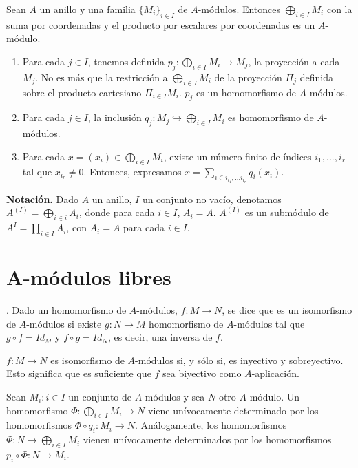 \documentclass[../main.tex]{subfiles}
\begin{document}
\begin{proposition}
  Sean $A$ un anillo y una familia $\{M_i\}_{i\in I}$ de $A$-módulos. Entonces $\bigoplus_{i\in I}M_i$ con la suma por coordenadas y el producto por escalares por coordenadas es un $A$-módulo.
\end{proposition}

\begin{remark}
  \begin{enumerate}
    \item Para cada $j\in I$, tenemos definida $p_j:\bigoplus_{i\in I}M_i\rightarrow M_j$, la proyección a cada $M_j$. No es más que la restricción a $\bigoplus_{i\in I}M_i$ de la proyección $\Pi_j$ definida sobre el producto cartesiano $\Pi_{i\in I}M_i$. $p_j$ es un homomorfismo de $A$-módulos.
    \item Para cada $j\in I$, la inclusión $q_j:M_j \hookrightarrow \bigoplus_{i\in I}M_i$ es homomorfismo de $A$-módulos.
    \item  Para cada $x=(x_i)\in \bigoplus_{i\in I}M_i$, existe un número finito de índices $i_1,...,i_r$ tal que $x_{i_r}\neq 0$. Entonces, expresamos $x=\sum_{i\in {i_{i_1},...i_{i_r}}} q_i(x_i)$.
  \end{enumerate}
\end{remark}

\textbf{Notación.} Dado $A$ un anillo, $I$ un conjunto no vacío, denotamos $A^{(I)}=\bigoplus_{i\in i} A_i$, donde para cada $i\in I$, $A_i=A$. $A^{(I)}$ es un submódulo de $A^{I} = \prod_{i\in I} A_i$, con $A_i=A$ para cada $i\in I$.

\section{A-módulos libres}

\begin{definition}. Dado un homomorfismo de $A$-módulos, $f:M\rightarrow N$, se dice que es un isomorfismo de $A$-módulos si existe $g:N\rightarrow M$ homomorfismo de $A$-módulos tal que $g\circ f = Id_M$ y $f\circ g = Id_N$, es decir, una inversa de $f$.
\end{definition}

\begin{remark} $f:M\longrightarrow N$ es isomorfismo de $A$-módulos si, y sólo si, es inyectivo y sobreyectivo. Esto significa que es suficiente que $f$ sea biyectivo como $A$-aplicación.
\end{remark}

\begin{lemma} Sean ${M_i:i\in I}$ un conjunto de $A$-módulos y sea $N$ otro $A$-módulo. Un homomorfismo $\Phi:\bigoplus_{i\in I} M_i \rightarrow N$ viene unívocamente determinado por los homomorfismos $\Phi \circ q_i:M_i \rightarrow N$. Análogamente, los homomorfismos $\Phi:N\rightarrow \bigoplus_{i\in I} M_i$ vienen unívocamente determinados por los homomorfismos $p_i\circ \Phi:N\rightarrow M_i$.
\end{lemma}
\end{document}
